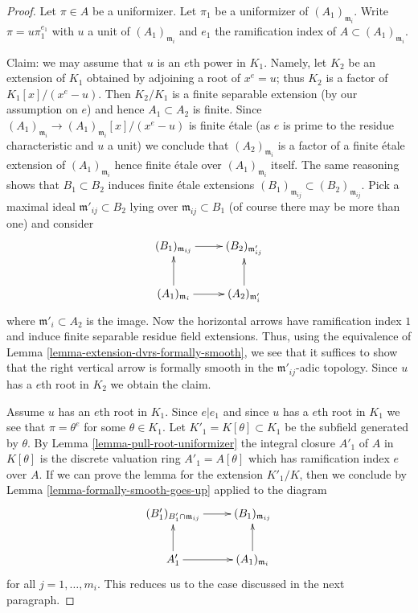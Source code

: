 \documentclass[10pt,a4paper]{amsart}
\theoremstyle{plain}
\theoremstyle{definition}
\theoremstyle{remark}
\numberwithin{equation}{subsection}
\begin{document}
\begin{proof}
Let $\pi \in A$ be a uniformizer. Let $\pi_1$ be a uniformizer
of $(A_1)_{\mathfrak m_i}$. Write $\pi = u \pi_1^{e_1}$ with $u$ a unit
of $(A_1)_{\mathfrak m_i}$ and $e_1$ the ramification index of
$A \subset (A_1)_{\mathfrak m_i}$.

\medskip\noindent
Claim: we may assume that $u$ is an $e$th power in $K_1$.
Namely, let $K_2$ be an extension of $K_1$ obtained by
adjoining a root of $x^e = u$; thus $K_2$ is a factor
of $K_1[x]/(x^e - u)$. Then $K_2/K_1$ is a finite
separable extension (by our assumption on $e$)
and hence $A_1 \subset A_2$ is finite.
Since $(A_1)_{\mathfrak m_i} \to (A_1)_{\mathfrak m_i}[x]/(x^e - u)$
is finite \'etale
(as $e$ is prime to the residue characteristic and $u$ a unit)
we conclude that $(A_2)_{\mathfrak m_i}$ is a factor of
a finite \'etale extension of $(A_1)_{\mathfrak m_i}$ hence
finite \'etale over $(A_1)_{\mathfrak m_i}$ itself.
The same reasoning shows that $B_1 \subset B_2$ induces
finite \'etale extensions
$(B_1)_{\mathfrak m_{ij}} \subset (B_2)_{\mathfrak m_{ij}}$.
Pick a maximal ideal $\mathfrak m'_{ij} \subset B_2$
lying over $\mathfrak m_{ij} \subset B_1$
(of course there may be more than one) and consider
$$
\xymatrix{
(B_1)_{\mathfrak m_{ij}} \ar[r] & (B_2)_{\mathfrak m'_{ij}} \\
(A_1)_{\mathfrak m_i} \ar[u] \ar[r] &
(A_2)_{\mathfrak m'_i} \ar[u]
}
$$
where $\mathfrak m'_i \subset A_2$ is the image.
Now the horizontal arrows have ramification index $1$
and induce finite separable residue field extensions.
Thus, using the equivalence of
Lemma \ref{lemma-extension-dvrs-formally-smooth},
we see that it suffices to show that the right vertical
arrow is formally smooth in the $\mathfrak m'_{ij}$-adic topology.
Since $u$ has a $e$th root
in $K_2$ we obtain the claim.

\medskip\noindent
Assume $u$ has an $e$th root in $K_1$.
Since $e | e_1$ and since $u$ has a $e$th root in $K_1$
we see that $\pi = \theta^e$ for some $\theta \in K_1$.
Let $K'_1 = K[\theta] \subset K_1$ be the subfield generated by $\theta$.
By Lemma \ref{lemma-pull-root-uniformizer} the integral closure $A'_1$
of $A$ in $K[\theta]$ is the discrete valuation ring $A'_1 = A[\theta]$
which has ramification index $e$ over $A$.
If we can prove the lemma for the extension $K'_1/K$,
then we conclude by Lemma \ref{lemma-formally-smooth-goes-up}
applied to the diagram
$$
\xymatrix{
(B'_1)_{B'_1 \cap \mathfrak m_{ij}} \ar[r] & (B_1)_{\mathfrak m_{ij}} \\
A'_1 \ar[u] \ar[r] &
(A_1)_{\mathfrak m_i} \ar[u]
}
$$
for all $j = 1, \ldots, m_i$. This reduces us to the case discussed
in the next paragraph.


\end{proof}
\end{document}
